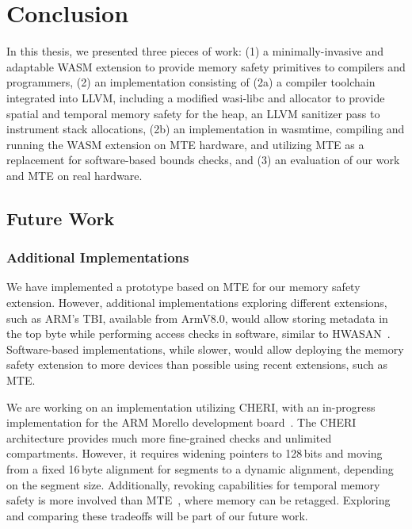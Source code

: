 \chapter{Conclusion}
\label{ch:conclusion}

In this thesis, we presented three pieces of work:
(1) a minimally-invasive and adaptable \ac{WASM} extension to provide memory safety primitives to compilers and programmers,
(2) an implementation consisting of (2a) a compiler toolchain integrated into LLVM, including a modified wasi-libc and allocator to provide spatial and temporal memory safety for the heap, an LLVM sanitizer pass to instrument stack allocations,
(2b) an implementation in wasmtime, compiling and running the \ac{WASM} extension on \ac{MTE} hardware, and utilizing \ac{MTE} as a replacement for software-based bounds checks,
and (3) an evaluation of our work and \ac{MTE} on real hardware.


\section{Future Work}
\label{sec:future-work}

\subsection{Additional Implementations}
\label{subsec:additional-implementations}

We have implemented a prototype based on \ac{MTE} for our memory safety extension.
However, additional implementations exploring different extensions, such as ARM's \ac{TBI}, available from ArmV8.0, would allow storing metadata in the top byte while performing access checks in software, similar to \ac{HWASAN}~\cite{serebryany2018memory}.
Software-based implementations, while slower, would allow deploying the memory safety extension to more devices than possible using recent extensions, such as \ac{MTE}.

We are working on an implementation utilizing \ac{CHERI}, with an in-progress implementation for the ARM Morello development board~\cite{UCAM-CL-TR-982}.
The CHERI architecture provides much more fine-grained checks and unlimited compartments.
However, it requires widening pointers to 128\,bits and moving from a fixed 16\,byte alignment for segments to a dynamic alignment, depending on the segment size.
Additionally, revoking capabilities for temporal memory safety is more involved than \ac{MTE}~\cite{xia2019cherivoke}, where memory can be retagged.
Exploring and comparing these tradeoffs will be part of our future work.

